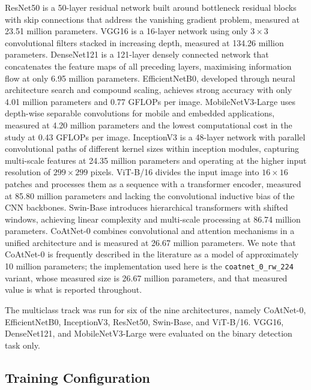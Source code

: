 \documentclass[final,3p,times,number]{elsarticle}
\begin{document}
ResNet50 is a 50-layer residual network built around bottleneck residual blocks with skip connections that address the vanishing gradient problem, measured at 23.51 million parameters. VGG16 is a 16-layer network using only $3\times 3$ convolutional filters stacked in increasing depth, measured at 134.26 million parameters. DenseNet121 is a 121-layer densely connected network that concatenates the feature maps of all preceding layers, maximising information flow at only 6.95 million parameters. EfficientNetB0, developed through neural architecture search and compound scaling, achieves strong accuracy with only 4.01 million parameters and 0.77 GFLOPs per image. MobileNetV3-Large uses depth-wise separable convolutions for mobile and embedded applications, measured at 4.20 million parameters and the lowest computational cost in the study at 0.43 GFLOPs per image. InceptionV3 is a 48-layer network with parallel convolutional paths of different kernel sizes within inception modules, capturing multi-scale features at 24.35 million parameters and operating at the higher input resolution of $299\times 299$ pixels. ViT-B/16 divides the input image into $16\times 16$ patches and processes them as a sequence with a transformer encoder, measured at 85.80 million parameters and lacking the convolutional inductive bias of the CNN backbones. Swin-Base introduces hierarchical transformers with shifted windows, achieving linear complexity and multi-scale processing at 86.74 million parameters. CoAtNet-0 combines convolutional and attention mechanisms in a unified architecture and is measured at 26.67 million parameters. We note that CoAtNet-0 is frequently described in the literature as a model of approximately 10 million parameters; the implementation used here is the \texttt{coatnet\_0\_rw\_224} variant, whose measured size is 26.67 million parameters, and that measured value is what is reported throughout.

The multiclass track was run for six of the nine architectures, namely CoAtNet-0, EfficientNetB0, InceptionV3, ResNet50, Swin-Base, and ViT-B/16. VGG16, DenseNet121, and MobileNetV3-Large were evaluated on the binary detection task only.

\subsection{Training Configuration}
\label{sec:training}
\end{document}
